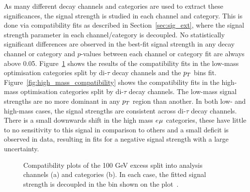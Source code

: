 As many different decay channels and categories are used to extract these significances, the signal strength is studied in each channel and category.
This is done via compatibility fits as described in Section~\ref{sec:sig_ext}, where the signal strength parameter in each channel/category is decoupled.
No statistically significant differences are observed in the best-fit signal strength in any decay channel or category and $p$-values between each channel or category fit are always above 0.05.
Figure~\ref{fig:low_mass_compatibility} shows the results of the compatibility fits in the low-mass optimisation categories split by di-$\tau$ decay channels and the $p_{T}$ bins fit. 
Figure~\ref{fig:high_mass_compatibility} shows the compatibility fits in the high-mass optimisation categories split by di-$\tau$ decay channels.
The low-mass signal strengths are no more dominant in any $p_{T}$ region than another.
In both low- and high-mass cases, the signal strengths are consistent across di-$\tau$ decay channels.
There is a small downwards shift in the high mass $e_{}\mu_{}$ categories, these have little to no sensitivity to this signal in comparison to others and a small deficit is observed in data, resulting in fits for a negative signal strength with a large uncertainty. 

\begin{figure}[!hbtp]
\centering
\caption[Plots of the compatibility of the 100 GeV excess across the di-$\tau$ decay channels and categories.]{Compatibility plots of the 100 GeV excess split into analysis channels (a) and categories (b). In each case, the fitted signal strength is decoupled in the bin shown on the plot~\cite{CMS:2022rbd}.}
\label{fig:low_mass_compatibility}
\end{figure}

